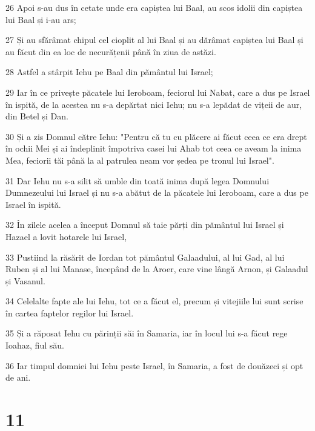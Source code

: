 \par 26 Apoi s-au dus în cetate unde era capiștea lui Baal, au scos idolii din capiștea lui Baal și i-au ars;
\par 27 Și au sfărâmat chipul cel cioplit al lui Baal și au dărâmat capiștea lui Baal și au făcut din ea loc de necurățenii până în ziua de astăzi.
\par 28 Astfel a stârpit Iehu pe Baal din pământul lui Israel;
\par 29 Iar în ce privește păcatele lui Ieroboam, feciorul lui Nabat, care a dus pe Israel în ispită, de la acestea nu s-a depărtat nici Iehu; nu s-a lepădat de vițeii de aur, din Betel și Dan.
\par 30 Și a zis Domnul către Iehu: "Pentru că tu cu plăcere ai făcut ceea ce era drept în ochii Mei și ai îndeplinit împotriva casei lui Ahab tot ceea ce aveam la inima Mea, feciorii tăi până la al patrulea neam vor ședea pe tronul lui Israel".
\par 31 Dar Iehu nu s-a silit să umble din toată inima după legea Domnului Dumnezeului lui Israel și nu s-a abătut de la păcatele lui Ieroboam, care a dus pe Israel în ispită.
\par 32 În zilele acelea a început Domnul să taie părți din pământul lui Israel și Hazael a lovit hotarele lui Israel,
\par 33 Pustiind la răsărit de Iordan tot pământul Galaadului, al lui Gad, al lui Ruben și al lui Manase, începând de la Aroer, care vine lângă Arnon, și Galaadul și Vasanul.
\par 34 Celelalte fapte ale lui Iehu, tot ce a făcut el, precum și vitejiile lui sunt scrise în cartea faptelor regilor lui Israel.
\par 35 Și a răposat Iehu cu părinții săi în Samaria, iar în locul lui s-a făcut rege Ioahaz, fiul său.
\par 36 Iar timpul domniei lui Iehu peste Israel, în Samaria, a fost de douăzeci și opt de ani.

\chapter{11}


